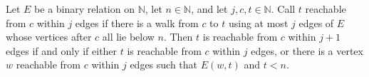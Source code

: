 \begin{lemma}
\label{Complexity.walkLe_succ_iff}
\leanok
{}
Let $E$ be a binary relation on $\mathbb{N}$, let $n\in\mathbb{N}$, and let
$j,c,t\in\mathbb{N}$. Call $t$ reachable from $c$ within $j$ edges if there is a walk
from $c$ to $t$ using at most $j$ edges of $E$ whose vertices after $c$ all lie below
$n$. Then $t$ is reachable from $c$ within $j+1$ edges if and only if either $t$ is
reachable from $c$ within $j$ edges, or there is a vertex $w$ reachable from $c$ within
$j$ edges such that $E(w,t)$ and $t<n$.
\end{lemma}
